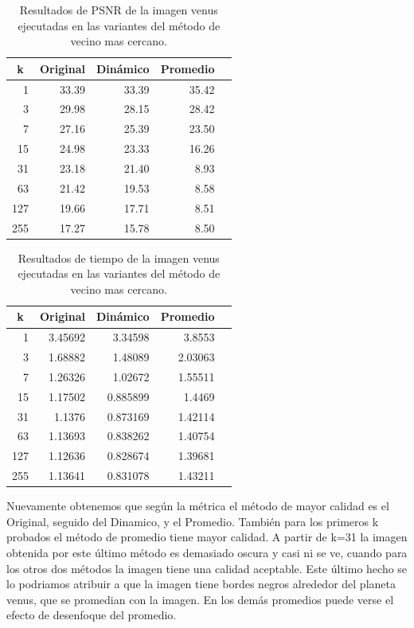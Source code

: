 \documentclass[a4paper]{article}
\newcounter{col}
\begin{document}
\begin{table}[H]
\centering
\begin{tabular}{|r|r|r|r|r|}
\hline
\multicolumn{1}{|c|}{k} & \multicolumn{1}{c|}{Original} & \multicolumn{1}{c|}{Dinámico} & \multicolumn{1}{c|}{Promedio} \\ \hline
1 & 33.39 & 33.39& 35.42 \\ \hline
3 & 29.98 &  28.15 & 28.42 \\ \hline
7 & 27.16 &  25.39 &  23.50 \\ \hline
15 &24.98&  23.33 &  16.26 \\ \hline
31 & 23.18 & 21.40&  8.93 \\ \hline
63 & 21.42 &   19.53 & 8.58 \\ \hline
127 & 19.66 &  17.71 &  8.51 \\ \hline
255 &17.27&  15.78 & 8.50 \\ \hline
\end{tabular}
\caption{Resultados de PSNR de la imagen venus ejecutadas en las variantes del m\'etodo de vecino mas cercano.}
\label{}
\end{table}

\begin{table}[H]
\centering
\begin{tabular}{|r|r|r|r|r|}
\hline
\multicolumn{1}{|c|}{k} & \multicolumn{1}{c|}{Original} & \multicolumn{1}{c|}{Dinámico} & \multicolumn{1}{c|}{Promedio} \\ \hline
1 & 3.45692 & 3.34598& 3.8553 \\ \hline
3 & 1.68882 &  1.48089 & 2.03063 \\ \hline
7 & 1.26326 & 1.02672 &  1.55511 \\ \hline
15 &1.17502&  0.885899&  1.4469 \\ \hline
31 & 1.1376 & 0.873169&  1.42114 \\ \hline
63 & 1.13693 &   0.838262& 1.40754 \\ \hline
127 & 1.12636 &  0.828674 &  1.39681 \\ \hline
255 &1.13641&  0.831078 & 1.43211 \\ \hline
\end{tabular}
\caption{Resultados de tiempo de la imagen venus ejecutadas en las variantes del m\'etodo de vecino mas cercano.}
\label{}
\end{table}



Nuevamente obtenemos que según la métrica el método de mayor calidad es el Original, seguido del Dinamico, y el Promedio. También para los primeros k probados el método de promedio tiene mayor calidad. A partir de k=31 la imagen obtenida por este \'ultimo método es demasiado oscura y casi ni se ve, cuando para los otros dos métodos la imagen tiene una calidad aceptable. Este \'ultimo hecho se lo podriamos atribuir a que la imagen tiene bordes negros alrededor del planeta venus, que se promedian con la imagen. En los dem\'as promedios puede verse el efecto de desenfoque del promedio.
\end{document}
